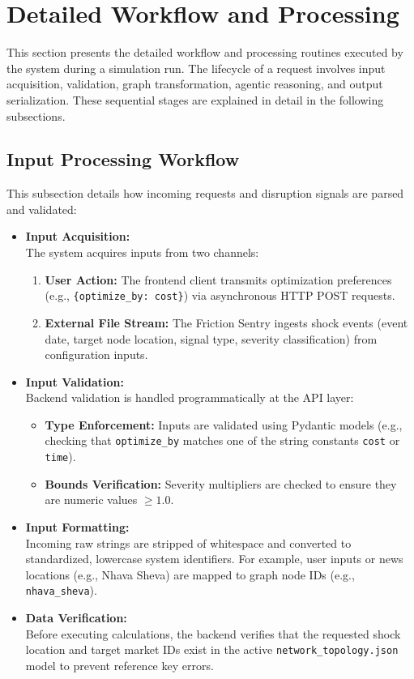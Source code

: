 \section[Detailed Workflow and Processing]{Detailed Workflow and Processing}
This section presents the detailed workflow and processing routines executed by the system during a simulation run. The lifecycle of a request involves input acquisition, validation, graph transformation, agentic reasoning, and output serialization. These sequential stages are explained in detail in the following subsections.

\subsection[Input Processing Workflow]{Input Processing Workflow}
This subsection details how incoming requests and disruption signals are parsed and validated:

\begin{itemize}
    \item \textbf{Input Acquisition:} \\
    The system acquires inputs from two channels:
    \begin{enumerate}
        \item \textbf{User Action:} The frontend client transmits optimization preferences (e.g., \texttt{\{optimize\_by: cost\}}) via asynchronous HTTP POST requests.
        \item \textbf{External File Stream:} The Friction Sentry ingests shock events (event date, target node location, signal type, severity classification) from configuration inputs.
    \end{enumerate}
    \item \textbf{Input Validation:} \\
    Backend validation is handled programmatically at the API layer:
    \begin{itemize}
        \item \textbf{Type Enforcement:} Inputs are validated using Pydantic models (e.g., checking that \texttt{optimize\_by} matches one of the string constants \texttt{cost} or \texttt{time}).
        \item \textbf{Bounds Verification:} Severity multipliers are checked to ensure they are numeric values $\geq 1.0$.
    \end{itemize}
    \item \textbf{Input Formatting:} \\
    Incoming raw strings are stripped of whitespace and converted to standardized, lowercase system identifiers. For example, user inputs or news locations (e.g., Nhava Sheva) are mapped to graph node IDs (e.g., \texttt{nhava\_sheva}).
    \item \textbf{Data Verification:} \\
    Before executing calculations, the backend verifies that the requested shock location and target market IDs exist in the active \texttt{network\_topology.json} model to prevent reference key errors.
\end{itemize}

